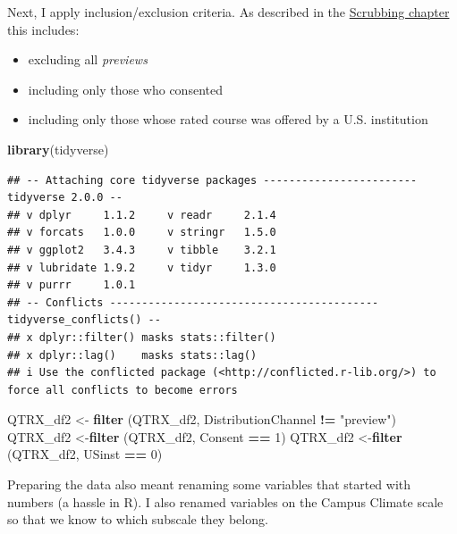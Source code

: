 \documentclass[
  11pt,
]{book}
\newenvironment{Shaded}{\begin{snugshade}}{\end{snugshade}}
\newcommand{\DecValTok}[1]{\textcolor[rgb]{0.06,0.06,0.06}{#1}}
\newcommand{\FunctionTok}[1]{\textcolor[rgb]{0.27,0.27,0.27}{\textbf{#1}}}
\newcommand{\NormalTok}[1]{#1}
\newcommand{\OtherTok}[1]{\textcolor[rgb]{0.37,0.37,0.37}{#1}}
\newcommand{\SpecialCharTok}[1]{\textcolor[rgb]{0.43,0.43,0.43}{\textbf{#1}}}
\newcommand{\StringTok}[1]{\textcolor[rgb]{0.5,0.5,0.5}{#1}}
\providecommand{\tightlist}{%
  \setlength{\itemsep}{0pt}\setlength{\parskip}{0pt}}
\begin{document}
Next, I apply inclusion/exclusion criteria. As described in the \protect\hyperlink{scrub}{Scrubbing chapter} this includes:

\begin{itemize}
\tightlist
\item
  excluding all \emph{previews}
\item
  including only those who consented
\item
  including only those whose rated course was offered by a U.S. institution
\end{itemize}

\begin{Shaded}
\begin{Highlighting}[]
\FunctionTok{library}\NormalTok{(tidyverse)}
\end{Highlighting}
\end{Shaded}

\begin{verbatim}
## -- Attaching core tidyverse packages ------------------------ tidyverse 2.0.0 --
## v dplyr     1.1.2     v readr     2.1.4
## v forcats   1.0.0     v stringr   1.5.0
## v ggplot2   3.4.3     v tibble    3.2.1
## v lubridate 1.9.2     v tidyr     1.3.0
## v purrr     1.0.1     
## -- Conflicts ------------------------------------------ tidyverse_conflicts() --
## x dplyr::filter() masks stats::filter()
## x dplyr::lag()    masks stats::lag()
## i Use the conflicted package (<http://conflicted.r-lib.org/>) to force all conflicts to become errors
\end{verbatim}

\begin{Shaded}
\begin{Highlighting}[]
\NormalTok{QTRX\_df2 }\OtherTok{\textless{}{-}} \FunctionTok{filter}\NormalTok{ (QTRX\_df2, DistributionChannel }\SpecialCharTok{!=} \StringTok{"preview"}\NormalTok{)}
\NormalTok{QTRX\_df2 }\OtherTok{\textless{}{-}}\FunctionTok{filter}\NormalTok{ (QTRX\_df2, Consent }\SpecialCharTok{==} \DecValTok{1}\NormalTok{)}
\NormalTok{QTRX\_df2 }\OtherTok{\textless{}{-}}\FunctionTok{filter}\NormalTok{ (QTRX\_df2, USinst }\SpecialCharTok{==} \DecValTok{0}\NormalTok{)}
\end{Highlighting}
\end{Shaded}

Preparing the data also meant renaming some variables that started with numbers (a hassle in R). I also renamed variables on the Campus Climate scale so that we know to which subscale they belong.
\end{document}
